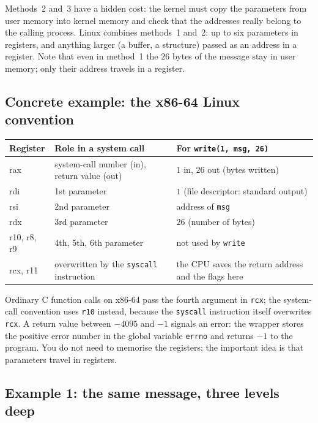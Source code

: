 \documentclass[11pt,a4paper]{article}
\newcommand{\cmd}[1]{\texttt{#1}}
\begin{document}
Methods~2 and~3 have a hidden cost: the kernel must copy the parameters from user memory into kernel memory and check that the addresses really belong to the calling process. Linux combines methods~1 and~2: up to six parameters in registers, and anything larger (a buffer, a structure) passed as an address in a register. Note that even in method~1 the $26$ bytes of the message stay in user memory; only their address travels in a register.

\subsection{Concrete example: the x86-64 Linux convention}

\begin{center}
\renewcommand{\arraystretch}{1.3}
\begin{tabularx}{\linewidth}{>{\ttfamily}l >{\raggedright\arraybackslash}X >{\raggedright\arraybackslash}X}
\toprule
\textrm{\textbf{Register}} & \textbf{Role in a system call} & \textbf{For \texttt{write(1, msg, 26)}} \\
\midrule
rax & system-call number (in), return value (out) & $1$ in, $26$ out (bytes written) \\
rdi & 1st parameter & $1$ (file descriptor: standard output) \\
rsi & 2nd parameter & address of \texttt{msg} \\
rdx & 3rd parameter & $26$ (number of bytes) \\
r10, r8, r9 & 4th, 5th, 6th parameter & not used by \cmd{write} \\
rcx, r11 & overwritten by the \texttt{syscall} instruction & the CPU saves the return address and the flags here \\
\bottomrule
\end{tabularx}
\end{center}

Ordinary C function calls on x86-64 pass the fourth argument in \texttt{rcx}; the system-call convention uses \texttt{r10} instead, because the \texttt{syscall} instruction itself overwrites \texttt{rcx}. A return value between $-4095$ and $-1$ signals an error: the wrapper stores the positive error number in the global variable \texttt{errno} and returns $-1$ to the program. You do not need to memorise the registers; the important idea is that parameters travel in registers.

\subsection{Example 1: the same message, three levels deep}
\end{document}
